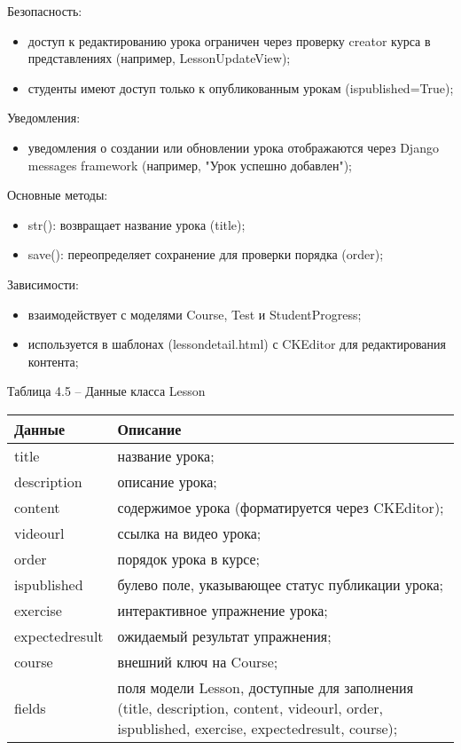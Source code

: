Безопасность: 
\begin{itemize}
	\item доступ к редактированию урока ограничен через проверку creator курса в представлениях (например, LessonUpdateView); 
	\item студенты имеют доступ только к опубликованным урокам (ispublished=True); 
\end{itemize}

Уведомления: 
\begin{itemize}
	\item уведомления о создании или обновлении урока отображаются через Django messages framework (например, "Урок успешно добавлен"); 
\end{itemize}

Основные методы: 
\begin{itemize}
	\item str(): возвращает название урока (title); 
	\item save(): переопределяет сохранение для проверки порядка (order); 
\end{itemize}

Зависимости: 
\begin{itemize}
	\item взаимодействует с моделями Course, Test и StudentProgress; 
	\item используется в шаблонах (lessondetail.html) с CKEditor для редактирования контента; 
\end{itemize}

Таблица 4.5 – Данные класса Lesson \\
\begin{tabular}{|p{4cm}|p{8cm}|}
	\hline
	Данные & Описание \\
	\hline
	title & название урока; \\
	description & описание урока; \\
	content & содержимое урока (форматируется через CKEditor); \\
	videourl & ссылка на видео урока; \\
	order & порядок урока в курсе; \\
	ispublished & булево поле, указывающее статус публикации урока; \\
	exercise & интерактивное упражнение урока; \\
	expectedresult & ожидаемый результат упражнения; \\
	course & внешний ключ на Course; \\
	fields & поля модели Lesson, доступные для заполнения (title, description, content, videourl, order, ispublished, exercise, expectedresult, course); \\
	\hline
\end{tabular}

